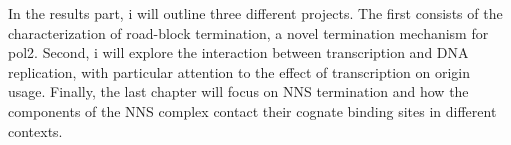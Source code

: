 In the results part, i will outline three different projects. The first consists of the characterization of road-block termination, a novel termination mechanism for \gls{pol2}. Second, i will explore the interaction between transcription and DNA replication, with particular attention to the effect of transcription on origin usage. Finally, the last chapter will focus on NNS termination and how the components of the NNS complex contact their cognate binding sites in different contexts.









